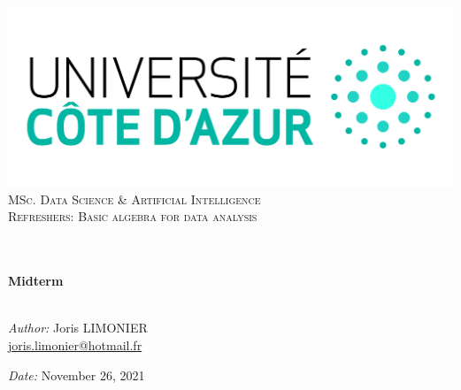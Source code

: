 \begin{titlepage}
	\begin{center}
		\includegraphics[width=\textwidth]{images/logo_uca.jpeg}\\[0.1cm]
		\vspace{1.5cm}
		\textsc{\Large MSc. Data Science \& Artificial Intelligence}\\[1.2cm]
		\textsc{\Large Refreshers: Basic algebra for data analysis}\\[1.2cm]
		\\
		\vspace{1cm}
		
		\HRule \\[0.6cm]
		{\huge \bfseries Midterm}\\[0.4cm]
		\HRule \\[1.5cm]
		\vspace{1cm}
		
		\vfill
		\large
		\emph{Author:} Joris LIMONIER\\
		\vspace{.2cm}
		\href{mailto:joris.limonier@hotmail.fr}{joris.limonier@hotmail.fr}\\
		\vspace{.2cm}


		\emph{Date:} {\large November 26, 2021}
	\end{center}
\end{titlepage}


